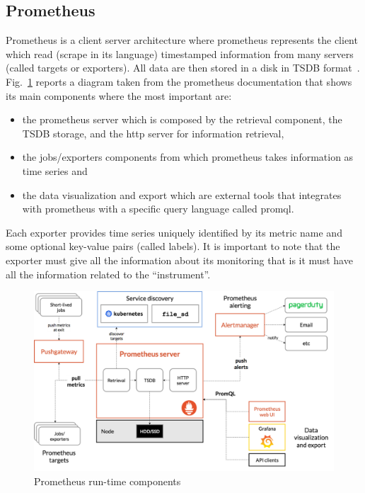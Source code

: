 \documentclass[]{spie}  %
\begin{document}
\subsection{Prometheus}

Prometheus is a client server architecture where prometheus represents the client which read (scrape in its language) timestamped information from many servers (called targets or exporters). All data are then stored in a disk in TSDB format~\cite{tsdb}. Fig.~\ref{fig:prometheus} reports a diagram taken from the prometheus documentation that shows its main components where the most important are: 
\begin{itemize}
    \item the prometheus server which is composed by the retrieval component, the TSDB storage, and the http server for information retrieval,
    \item the jobs/exporters components from which prometheus takes information as time series and 
    \item the data visualization and export which are external tools that integrates with prometheus with a specific query language called promql. 
\end{itemize}
Each exporter provides time series uniquely identified by its metric name and some optional key-value pairs (called labels). It is important to note that the exporter must give all the information about its monitoring that is it must have all the information related to the “instrument”. 

\begin{figure}[!htb]
   \centering
   \includegraphics*[width=0.6\columnwidth]{prometheus.png}
   \caption{Prometheus run-time components}
   \label{fig:prometheus}
\end{figure}
\end{document}
